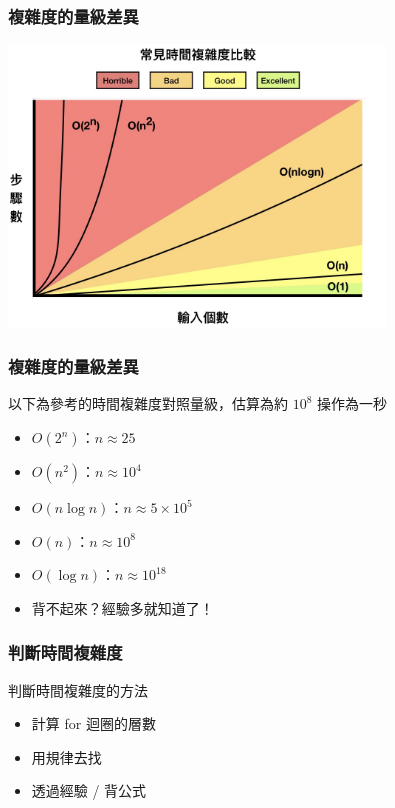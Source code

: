 \documentclass{beamer}
\begin{document}
\begin{frame}
    \frametitle{複雜度的量級差異}
    \includegraphics[width=10.0cm]{img/time.png}
\end{frame}

\begin{frame}
    \frametitle{複雜度的量級差異}
    以下為參考的時間複雜度對照量級，估算為約 $10^8$ 操作為一秒
    \begin{itemize}
        \item $O(2^n)$：$n \approx 25$
        \item $O(n^2)$：$n \approx 10^4$
        \item $O(n \log{n})$：$n \approx 5 \times 10^5$
        \item $O(n)$：$n \approx 10^8$
        \item $O(\log{n})$：$n \approx 10^{18}$
        \vspace{0.5cm}
        \item<2-> 背不起來？經驗多就知道了！
    \end{itemize}
\end{frame}

\begin{frame}
    \frametitle{判斷時間複雜度}
    判斷時間複雜度的方法
    \vspace{0.5cm}
    \begin{itemize}
        \item 計算 for 迴圈的層數
        \item 用規律去找
        \item 透過經驗 / 背公式
    \end{itemize}
\end{frame}
\end{document}
